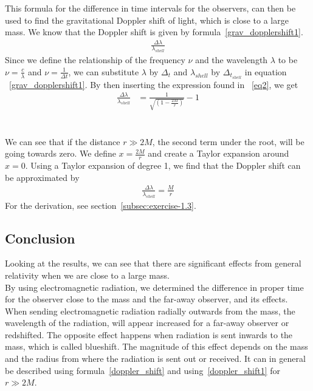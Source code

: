 \documentclass[reprint,english,notitlepage]{revtex4-2}
\begin{document}
        This formula for the difference in time intervals for the observers, can then be used to find the gravitational Doppler shift of light, which is close to a large mass.
        We know that the Doppler shift is given by formula~\eqref{grav_dopplershift1}.
        \begin{align}
            \frac{\Delta \lambda}{\lambda_{shell}} \label{grav_dopplershift1}
        \end{align}
        Since we define the relationship of the frequency $\nu$ and the wavelength $\lambda$ to be $\nu = \frac{c}{\lambda}$ and $\nu = \frac{1}{\Delta t}$, we can substitute $\lambda$ by $\Delta_t$ and $\lambda_{shell}$ by $\Delta_t_{shell}$ in equation ~\eqref{grav_dopplershift1}.
        By then inserting the expression found in ~\eqref{eq2}, we get
        \begin{align}
            \frac{\Delta \lambda}{\lambda_{shell}} &= \frac{1}{\sqrt{\left(1-\frac{2M}{r}\right)}} - 1 \label{doppler_shift}
        \end{align}\\\\

        We can see that if the distance $r \gg 2M$, the second term under the root, will be going towards zero.
        We define $x = \frac{2M}{r}$ and create a Taylor expansion around $x = 0$.
        Using a Taylor expansion of degree 1, we find that the Doppler shift can be approximated by
        \begin{align}
            \frac{\Delta \lambda}{\lambda_{shell}} = \frac{M}{r} \label{doppler_shift1}
        \end{align}
        For the derivation, see section~\ref{subsec:exercise-1.3}.
        


    \subsection{Conclusion}\label{subsec:conclusion1}
        Looking at the results, we can see that there are significant effects from general relativity when we are close to a large mass.\\
        By using electromagnetic radiation, we determined the difference in proper time for the observer close to the mass and the far-away observer, and its effects.\\

        When sending electromagnetic radiation radially outwards from the mass, the wavelength of the radiation, will appear increased for a far-away observer or redshifted.
        The opposite effect happens when radiation is sent inwards to the mass, which is called blueshift.
        The magnitude of this effect depends on the mass and the radius from where the radiation is sent out or received.
        It can in general be described using formula~\eqref{doppler_shift} and using~\eqref{doppler_shift1} for $r \gg 2M$.
\end{document}
